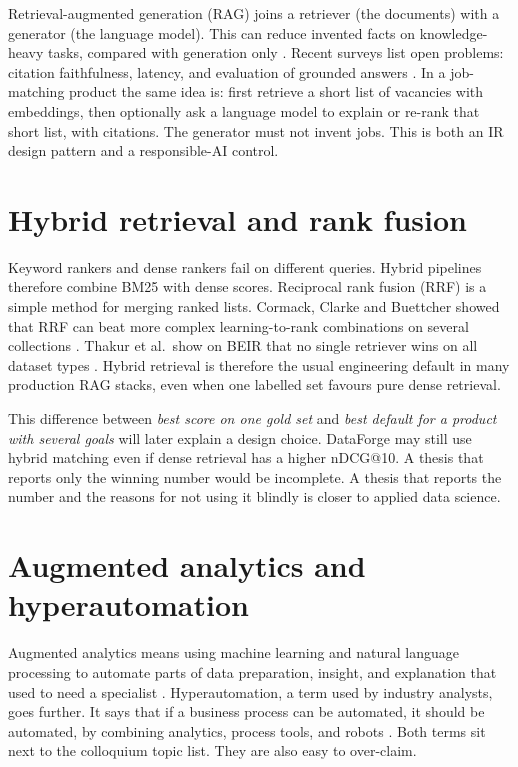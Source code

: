 Retrieval-augmented generation (RAG) joins a retriever (the documents) with a generator (the language model). This can reduce invented facts on knowledge-heavy tasks, compared with generation only . Recent surveys list open problems: citation faithfulness, latency, and evaluation of grounded answers . In a job-matching product the same idea is: first retrieve a short list of vacancies with embeddings, then optionally ask a language model to explain or re-rank that short list, with citations. The generator must not invent jobs. This is both an IR design pattern and a responsible-AI control.

\section{Hybrid retrieval and rank fusion}
\label{sec:hybrid}

Keyword rankers and dense rankers fail on different queries. Hybrid pipelines therefore combine BM25 with dense scores. Reciprocal rank fusion (RRF) is a simple method for merging ranked lists. Cormack, Clarke and Buettcher showed that RRF can beat more complex learning-to-rank combinations on several collections . Thakur et al.\ show on BEIR that no single retriever wins on all dataset types . Hybrid retrieval is therefore the usual engineering default in many production RAG stacks, even when one labelled set favours pure dense retrieval.

This difference between \emph{best score on one gold set} and \emph{best default for a product with several goals} will later explain a design choice. DataForge may still use hybrid matching even if dense retrieval has a higher nDCG@10. A thesis that reports only the winning number would be incomplete. A thesis that reports the number and the reasons for not using it blindly is closer to applied data science.

\section{Augmented analytics and hyperautomation}
\label{sec:augmented}

Augmented analytics means using machine learning and natural language processing to automate parts of data preparation, insight, and explanation that used to need a specialist . Hyperautomation, a term used by industry analysts, goes further. It says that if a business process can be automated, it should be automated, by combining analytics, process tools, and robots . Both terms sit next to the colloquium topic list. They are also easy to over-claim.

